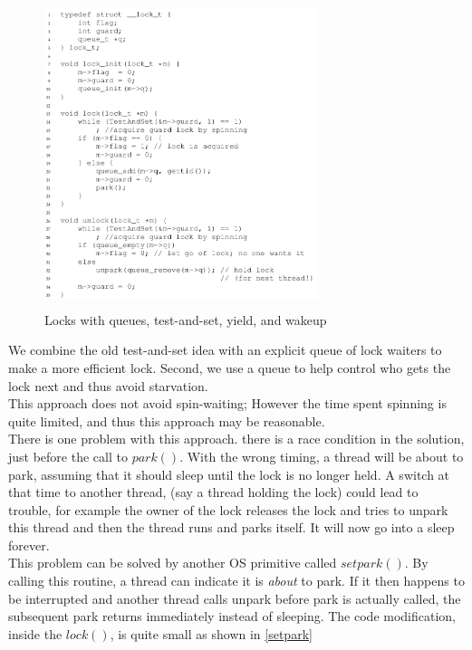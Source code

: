 \begin{figure}[h!]
    \label{289}
    \begin{center}
        \includegraphics[width=8cm, height=9cm]{img/289.png}
        \caption{Locks with queues, test-and-set, yield, and wakeup}
    \end{center}
\end{figure}

We combine the old test-and-set idea with an explicit queue of lock waiters to
make a more efficient lock. Second, we use a queue to help control who gets the
lock next and thus avoid starvation.\\

This approach does not avoid spin-waiting; However the time spent spinning is
quite limited, and thus this approach may be reasonable.\\

There is one problem with this approach. there is a race condition in the solution,
just before the call to $park()$. With the wrong timing, a thread
will be about to park, assuming that it should sleep until the lock is no longer
held. A switch at that time to another thread, (say a thread holding the lock)
could lead to trouble, for example the owner of the lock releases the lock
and tries to unpark this thread and then the thread runs and parks itself.
It will now go into a sleep forever.\\

This problem can be solved by another OS primitive called $setpark()$. By
calling this routine, a thread can indicate it is \textit{about} to park.
If it then happens to be interrupted and another thread calls unpark
before park is actually called, the subsequent park returns immediately instead
of sleeping. The code modification, inside the $lock()$, is quite small as shown
in \ref{setpark}

